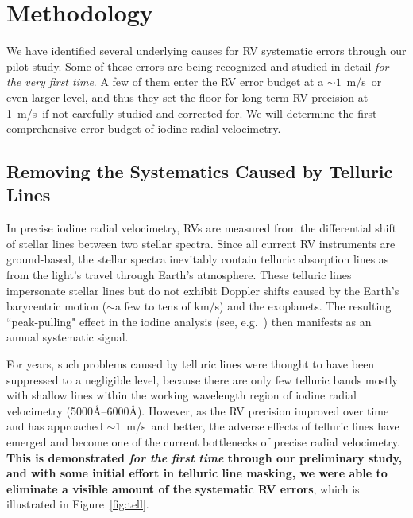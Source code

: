 \documentclass[12pt]{article}
\def\mps{m/s}
\begin{document}
\vspace{-10pt}
\section{Methodology}
\vspace{-5pt}

We have identified several underlying causes for RV systematic errors
through our pilot study. Some of these errors are being recognized and
studied in detail \textit{for the very first time}. A few of them
enter the RV error budget at a $\sim 1$~\mps\ or even larger level,
and thus they set the floor for long-term RV precision at 1~\mps\ if
not carefully studied and corrected for. We will determine the first
comprehensive error budget of iodine radial velocimetry.

\vspace{-10pt}
\subsection{Removing the Systematics Caused by Telluric
  Lines}\label{sec:tell}
\vspace{-5pt}

In precise iodine radial velocimetry, RVs are measured from the
differential shift of stellar lines between two stellar spectra.
Since all current RV instruments are ground-based, the stellar spectra
inevitably contain telluric absorption lines as from the light's
travel through Earth's atmosphere. These telluric lines impersonate
stellar lines but do not exhibit Doppler shifts caused by the Earth's
barycentric motion ($\sim$a few to tens of k\mps) and the exoplanets. The
resulting ``peak-pulling" effect in the iodine analysis (see,
e.g.~\citealt{wright2013}) then manifests as an annual systematic
signal.

For years, such problems caused by telluric lines were thought to have
been suppressed to a negligible level, because there are only few
telluric bands mostly with shallow lines within the working wavelength
region of iodine radial velocimetry (5000\AA--6000\AA). However, as
the RV precision improved over time and has approached
$\sim1$~\mps\ and better, the adverse effects of telluric lines have
emerged and become one of the current bottlenecks of precise radial
velocimetry. \textbf{This is demonstrated \textit{for the first time}
  through our preliminary study, and with some initial effort in
  telluric line masking, we were able to eliminate a visible amount of
  the systematic RV errors}, which is illustrated in
Figure~\ref{fig:tell}.
\end{document}
